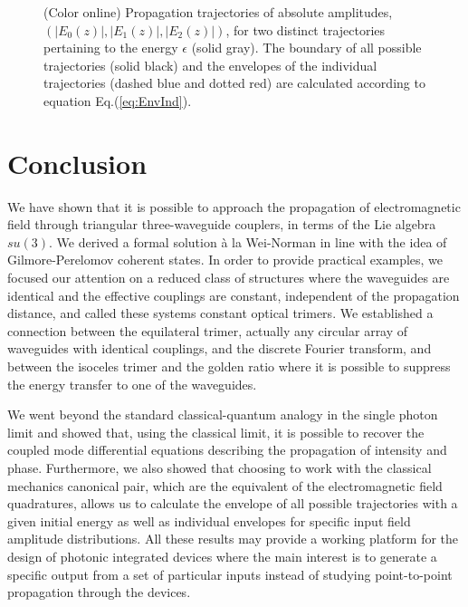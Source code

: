 \documentclass[9pt,twocolumn,twoside]{osajnl}
\begin{document}
\begin{figure}[htbp]
	\centering
	\caption{(Color online) Propagation trajectories of absolute amplitudes, $(\vert E_{0}(z) \vert, \vert E_{1}(z) \vert, \vert E_{2}(z) \vert )$,  for two 
		distinct trajectories pertaining to the energy $\epsilon$ (solid gray). The boundary of all possible trajectories (solid black) and the envelopes of the individual  trajectories (dashed blue and dotted red) are calculated according to equation Eq.(\ref{eq:EnvInd}).} 
	
	\label{fig:Fig7}
\end{figure}


\section{Conclusion}
We have shown that it is possible to approach the propagation of electromagnetic field through triangular three-waveguide couplers, in terms of the Lie algebra $su(3)$. 
We derived a formal solution \`a la Wei-Norman in line with the idea of Gilmore-Perelomov coherent states.
In order to provide practical examples, we focused our attention on a reduced class of structures where the waveguides are identical and the effective couplings are constant, independent of the propagation distance, and called these systems constant optical trimers. 
We established a connection between the equilateral trimer, actually any circular array of waveguides with identical couplings, and the discrete Fourier transform, and between the isoceles trimer and the golden ratio where it is possible to suppress the energy transfer to one of the waveguides. 

We went beyond the standard classical-quantum analogy in the single photon limit and showed that, using the classical limit, it is possible to recover the coupled mode differential equations describing the propagation of intensity and phase.
Furthermore, we also showed that choosing to work with the classical mechanics canonical pair, which are the equivalent of the electromagnetic field quadratures, allows us to calculate the envelope of all possible trajectories with a given initial energy as well as individual envelopes for specific input field amplitude distributions.
All these results may provide a working platform for the design of photonic integrated devices where the main interest is to generate a specific output from a set of particular inputs instead of studying point-to-point propagation through the devices.
\end{document}
